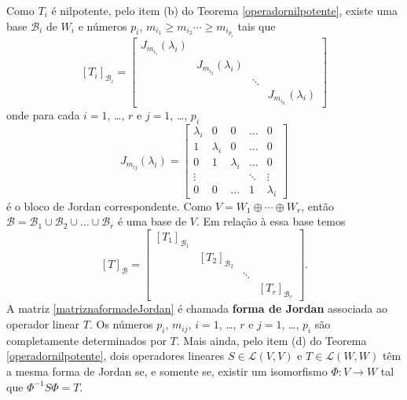 Como $T_i$ \'e nilpotente, pelo item (b) do Teorema \ref{operadornilpotente}, existe uma base $\mathcal{B}_i$ de $W_i$ e n\'umeros $p_i$, $m_{i_1} \ge m_{i_2} \cdots \ge m_{i_{p_i}}$ tais que
\[
	[T_i]_{\mathcal{B}_i} = \begin{bmatrix}
		J_{m_{i_1}}(\lambda_i)\\
		& J_{m_{i_2}}(\lambda_i)\\
		 & & \ddots\\
		& & & J_{m_{i_{p_i}}}(\lambda_i)
	\end{bmatrix}
\]
onde para cada $i = 1$, \dots, $r$ e $j = 1$, \dots, $p_i$
\[
	J_{m_{ij}}(\lambda_i) = \begin{bmatrix}
		\lambda_i & 0 & 0 & \dots & 0\\
		1 & \lambda_i & 0 & \dots & 0\\
		0 & 1 & \lambda_i & \dots & 0\\
		\vdots& & & \ddots & \vdots\\
		0 & 0 & \dots & 1 & \lambda_i
	\end{bmatrix}
\]
\'e o bloco de Jordan correspondente. Como $V = W_1 \oplus \cdots \oplus W_r$, ent\~ao $\mathcal{B} = \mathcal{B}_1 \cup \mathcal{B}_2 \cup \dots \cup \mathcal{B}_r$ \'e uma base de $V$. Em rela\c{c}\~ao \`a essa base temos
\begin{equation}\label{matriznaformadeJordan}
	[T]_\mathcal{B} = \begin{bmatrix}
		[T_1]_{\mathcal{B}_1}\\
		& [T_2]_{\mathcal{B}_2}\\
		& & \ddots\\
		& & & [T_r]_{\mathcal{B}_r}
	\end{bmatrix}.
\end{equation}
A matriz \eqref{matriznaformadeJordan} \'e chamada \textbf{forma de Jordan} associada ao operador linear $T$. Os n\'umeros $p_i$, $m_{ij}$, $i = 1$, \dots, $r$ e $j = 1$, \dots, $p_i$ s\~ao completamente determinados por $T$. Mais ainda, pelo item (d) do Teorema \ref{operadornilpotente}, dois operadores lineares $S \in \mathcal{L}(V,V)$ e $T \in \mathcal{L}(W,W)$ t\^em a mesma forma de Jordan se, e somente se, existir um isomorfismo $\Phi : V \to W$ tal que $\Phi^{-1}S\Phi = T$.


